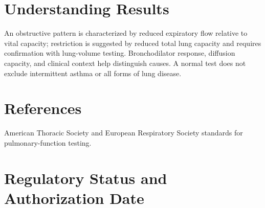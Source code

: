 \section*{Understanding Results}
An obstructive pattern is characterized by reduced expiratory flow relative to vital capacity; restriction is suggested by reduced total lung capacity and requires confirmation with lung-volume testing. Bronchodilator response, diffusion capacity, and clinical context help distinguish causes. A normal test does not exclude intermittent asthma or all forms of lung disease.

\section*{References}
American Thoracic Society and European Respiratory Society standards for pulmonary-function testing.

\clearpage


\section*{Regulatory Status and Authorization Date}

\clearpage
